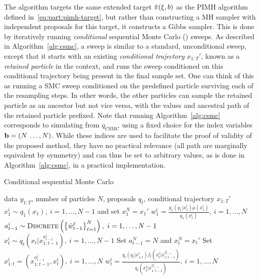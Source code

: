 The \pg algorithm targets the same extended target $\tilde{\pi}(\mathbf{\xi},b)$ as the PIMH algorithm defined
in~\eqref{eq:part:pimh-target}, but rather than constructing a MH sampler with independent proposals for
this target, it constructs a Gibbs sampler.  This is done by iteratively 
running \emph{conditional} sequential Monte Carlo (\csmc) sweeps. As described in Algorithm~\ref{alg:csmc},
a \csmc sweep is similar to a standard, unconditional \smc sweep, except that it starts
with an existing \emph{conditional trajectory} $x_{1:T}'$, known as a \emph{retained particle} in the \pg
context, and runs the sweep conditioned on this conditional trajectory being present in the final sample
set.  One can think of this as running a SMC sweep conditioned on the predefined particle surviving each
of the resampling steps.  In other words, the other particles can sample the retained particle as an
ancestor but not vice versa, with the values and ancestral path of the retained particle prefixed. 
Note that running Algorithm~\ref{alg:csmc} corresponds to simulating from $q_\text{CSMC}$ using a fixed
choice for the index variables $\mathbf{b} = (N\,\ldots,N)$. While these indices are used to facilitate the
proof of validity of the proposed method, they have no practical relevance (all path are marginally equivalent
by symmetry) and can thus be set to arbitrary
values, as is done in Algorithm~\ref{alg:csmc}, in a practical implementation.
\begin{algorithm}[tb]
	\caption{Conditional sequential Monte Carlo}
	\label{alg:csmc}
	\begin{spacing}{1.2}
		\begin{algorithmic}[1]
			\renewcommand{\algorithmicrequire}{\textbf{Inputs:}}
			\renewcommand{\algorithmicensure}{\textbf{Outputs:}}				 
			\Require data $y_{1:T}$, number of particles $N$, proposals $q_t$, conditional trajectory $x_{1:T}'$
			\State $x_1^i \sim q_1(x_1), ~i=1,\ldots,N-1$ and set $x_1^N = x_1'$
			\State $w_1^i = \frac{g_1(y_1|x_1^i) \mu(x_1^i)}{q_1(x_1^i)}, ~i=1,\ldots,N$
			\State $a_{t-1}^i \sim \operatorname*{\textsc{Discrete}}\left(\left\{\bar w_{t-1}^\ell\right\}_{\ell=1}^N\right), ~i=1,\ldots,N-1$
			\State $x_t^i \sim q_t(x_t | x_{1:t-1}^{a_{t-1}^i}), ~i=1,\ldots,N-1$
			\State Set $a_{t-1}^N = N$ and $x_t^N = x_t'$
			\State Set $x_{1:t}^i = (x_{1:t-1}^{a_{t-1}^i},x_t^i), ~i=1,\ldots,N$
			\State $w_t^i = \frac{g_t(y_t|x_{1:t}^i) f_t(x_t^i | x_{1:t-1}^{a_{t-1}^i})}{q_t(x_t^i|x_{1:t-1}^{a_{t-1}^i})}, ~i=1,\ldots,N$
			\EndFor
		\end{algorithmic}
	\end{spacing}
\end{algorithm}

